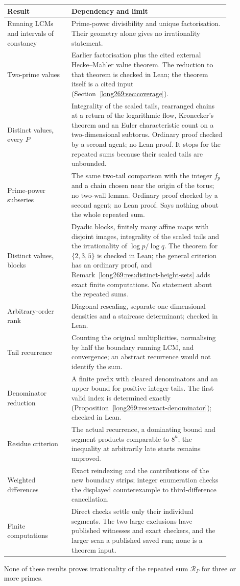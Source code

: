 \begin{center}\small
\begin{tabular}{p{0.26\linewidth}p{0.64\linewidth}}
\hline
Result & Dependency and limit\\\hline
Running LCMs and intervals of constancy & Prime-power divisibility and unique factorisation.
Their geometry alone gives no irrationality statement.\\
Two-prime values & Earlier factorisation plus the cited external
Hecke--Mahler value theorem.  The reduction to that theorem is checked in
Lean; the theorem itself is a cited input (Section~\ref{long269:sec:coverage}).\\
Distinct values, every $P$ & Integrality of the scaled tails,
rearranged chains at a return of the logarithmic flow, Kronecker's theorem
and an Euler characteristic count on a two-dimensional subtorus.  Ordinary
proof checked by a second agent; no Lean proof.  It stops for the repeated sums because
their scaled tails are unbounded.\\
Prime-power subseries & The same two-tail comparison with the integer $f_p$
and a chain chosen near the origin of the torus; no two-wall lemma.
Ordinary proof checked by a second agent; no Lean proof.  Says nothing about the whole
repeated sum.\\
Distinct values, blocks & Dyadic blocks, finitely many affine maps with
disjoint images, integrality of the scaled tails and the irrationality of
$\log p/\log q$.  The theorem for $\{2,3,5\}$ is checked in Lean; the
general criterion has an ordinary proof, and
Remark~\ref{long269:res:distinct-height-sets} adds exact finite
computations.  No statement about the repeated sums.\\
Arbitrary-order rank & Diagonal rescaling, separate one-dimensional
densities and a staircase determinant; checked in Lean.\\
Tail recurrence & Counting the original multiplicities, normalising by
half the boundary running LCM, and convergence; an abstract recurrence would
not identify the sum.\\
Denominator reduction & A finite prefix with cleared denominators and
an upper bound for positive integer tails.  The first valid index is
determined exactly (Proposition~\ref{long269:res:exact-denominator}); checked
in Lean.\\
Residue criterion & The actual recurrence, a dominating bound and segment
products comparable to $8^h$; the inequality at arbitrarily late starts remains
unproved.\\
Weighted differences & Exact reindexing and the contributions of the
new boundary strips; integer enumeration checks the displayed
counterexample to third-difference cancellation.\\
Finite computations & Direct checks settle only their individual
segments.  The two large exclusions have published witnesses and exact
checkers, and the larger scan a published saved run; none is a theorem
input.\\\hline
\end{tabular}
\end{center}
None of these results proves irrationality of the repeated sum
$\mathcal R_P$ for three or more primes.

